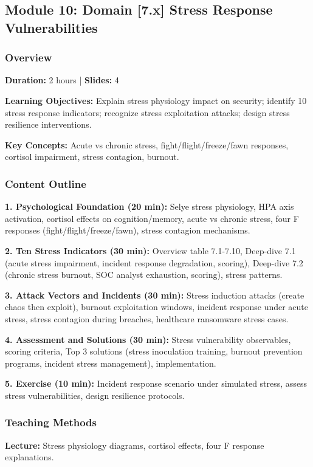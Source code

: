 \documentclass[11pt,a4paper]{article}
\begin{document}
\subsection{Module 10: Domain [7.x] Stress Response Vulnerabilities}

\subsubsection{Overview}
\textbf{Duration:} 2 hours | \textbf{Slides:} 4

\textbf{Learning Objectives:} Explain stress physiology impact on security; identify 10 stress response indicators; recognize stress exploitation attacks; design stress resilience interventions.

\textbf{Key Concepts:} Acute vs chronic stress, fight/flight/freeze/fawn responses, cortisol impairment, stress contagion, burnout.

\subsubsection{Content Outline}
\textbf{1. Psychological Foundation (20 min):} Selye stress physiology, HPA axis activation, cortisol effects on cognition/memory, acute vs chronic stress, four F responses (fight/flight/freeze/fawn), stress contagion mechanisms.

\textbf{2. Ten Stress Indicators (30 min):} Overview table 7.1-7.10, Deep-dive 7.1 (acute stress impairment, incident response degradation, scoring), Deep-dive 7.2 (chronic stress burnout, SOC analyst exhaustion, scoring), stress patterns.

\textbf{3. Attack Vectors and Incidents (30 min):} Stress induction attacks (create chaos then exploit), burnout exploitation windows, incident response under acute stress, stress contagion during breaches, healthcare ransomware stress cases.

\textbf{4. Assessment and Solutions (30 min):} Stress vulnerability observables, scoring criteria, Top 3 solutions (stress inoculation training, burnout prevention programs, incident stress management), implementation.

\textbf{5. Exercise (10 min):} Incident response scenario under simulated stress, assess stress vulnerabilities, design resilience protocols.

\subsubsection{Teaching Methods}
\textbf{Lecture:} Stress physiology diagrams, cortisol effects, four F response explanations.
\end{document}
